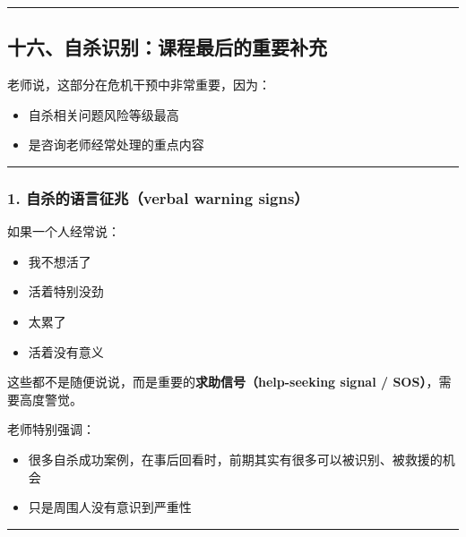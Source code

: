 \documentclass[
  chinese,
  9pt,
  a4paper,
]{ctexart}
\providecommand{\tightlist}{%
  \setlength{\itemsep}{0pt}\setlength{\parskip}{0pt}}
\begin{document}
\begin{center}\rule{0.5\linewidth}{0.5pt}\end{center}

\subsection{十六、自杀识别：课程最后的重要补充}\label{ux5341ux516dux81eaux6740ux8bc6ux522bux8bfeux7a0bux6700ux540eux7684ux91cdux8981ux8865ux5145}

老师说，这部分在危机干预中非常重要，因为：

\begin{itemize}
\tightlist
\item
  自杀相关问题风险等级最高
\item
  是咨询老师经常处理的重点内容
\end{itemize}

\begin{center}\rule{0.5\linewidth}{0.5pt}\end{center}

\subsubsection{1. 自杀的语言征兆（verbal warning
signs）}\label{ux81eaux6740ux7684ux8bedux8a00ux5f81ux5146verbal-warning-signs}

如果一个人经常说：

\begin{itemize}
\tightlist
\item
  我不想活了
\item
  活着特别没劲
\item
  太累了
\item
  活着没有意义
\end{itemize}

这些都不是随便说说，而是重要的\textbf{求助信号（help-seeking signal /
SOS）}，需要高度警觉。

老师特别强调：

\begin{itemize}
\tightlist
\item
  很多自杀成功案例，在事后回看时，前期其实有很多可以被识别、被救援的机会
\item
  只是周围人没有意识到严重性
\end{itemize}

\begin{center}\rule{0.5\linewidth}{0.5pt}\end{center}
\end{document}
